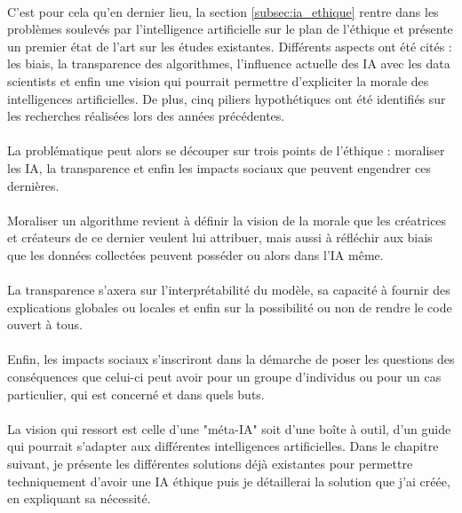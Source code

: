 \documentclass[10pt, french, a4paper]{article}
\begin{document}
\paragraph{}
C’est pour cela qu’en dernier lieu, la section \ref{subsec:ia_ethique} rentre dans les problèmes soulevés par l’intelligence artificielle sur le plan de l’éthique et présente un premier état de l’art sur les études existantes. Différents aspects ont été cités : les biais, la transparence des algorithmes, l’influence actuelle des IA avec les data scientists et enfin une vision qui pourrait permettre d’expliciter la morale des intelligences artificielles. De plus, cinq piliers hypothétiques ont été identifiés sur les recherches réalisées lors des années précédentes.

\paragraph{}
La problématique peut alors se découper sur trois points de l’éthique : moraliser les IA, la transparence et enfin les impacts sociaux que peuvent engendrer ces dernières.

\paragraph{}
Moraliser un algorithme revient à définir la vision de la morale que les créatrices et créateurs de ce dernier veulent lui attribuer, mais aussi à réfléchir aux biais que les données collectées peuvent posséder ou alors dans l’IA même.

\paragraph{}
La transparence s’axera sur l’interprétabilité du modèle, sa capacité à fournir des explications globales ou locales et enfin sur la possibilité ou non de rendre le code ouvert à tous.

\paragraph{}
Enfin, les impacts sociaux s’inscriront dans la démarche de poser les questions des conséquences que celui-ci peut avoir pour un groupe d’individus ou pour un cas particulier, qui est concerné et dans quels buts.

\paragraph{}
La vision qui ressort est celle d’une "méta-IA" soit d’une boîte à outil, d’un guide qui pourrait s’adapter aux différentes intelligences artificielles. Dans le chapitre suivant, je présente les différentes solutions déjà existantes pour permettre techniquement d'avoir une IA éthique puis je détaillerai la solution que j'ai créée, en expliquant sa nécessité.
\end{document}
